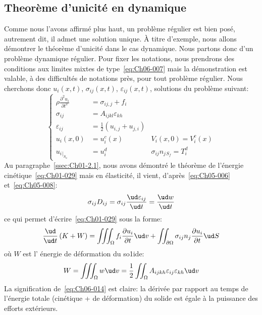 \subsection{Theorème d'unicité en dynamique} \label{ssec:Ch06-1.2}
Comme nous l'avons affirmé plus haut, un problème régulier est bien 
posé, autrement dit, il admet une solution unique.
\`A titre d'exemple, nous allons démontrer le théorème d'unicité dans le cas dynamique.
Nous partons donc d'un problème dynamique régulier.
Pour fixer les notations, nous prendrons des conditions aux limites mixtes de type~\eqref{eq:Ch06-007} mais la démonstration est valable, à des difficultés de notations près, pour tout problème régulier.
Nous cherchons donc $u_i\left( x,t \right)$, $\sigma_{ij}\left( x,t \right)$, $\varepsilon_{ij}\left( x,t \right)$, solutions du problème suivant:
\begin{equation}
    \left\{
    \begin{aligned}
        \rho \frac{\partial^2 u_i}{\partial t^2} &= \sigma_{ij,j} + f_i \\
        \sigma_{ij} &= A_{ijkl} \varepsilon_{kh} \\
        \varepsilon_{ij} &= \frac{1}{2} \left( u_{i,j} + u_{j,i} \right) \\
        u_i \left( x,0 \right) &= u_i^c \left( x \right) \quad & V_i\left( x,0 \right) = V_i^c\left( x \right) \\
        u_i{}_{|_{S_u}} &= u_i^d  \quad & \sigma_{ij} n_j{}_{S_f} = T_i^d
    \end{aligned}
    \right.
    \label{eq:Ch06-012}
\end{equation}
Au paragraphe~\ref{ssec:Ch01-2.1}, nous avons démontré le théorème de l'énergie cinétique~\eqref{eq:Ch01-029} mais en élasticité, il vient, d'après~\eqref{eq:Ch05-006} et~\eqref{eq:Ch05-008}:
\begin{equation}
    \sigma_{ij} D_{ij} = \sigma_{ij} \frac{\ud \varepsilon_{ij}}{\ud t} = \frac{\ud w}{\ud t}
    \label{eq:Ch06-013}
\end{equation}
ce qui permet d'écrire~\eqref{eq:Ch01-029} sous la forme:
\begin{equation}
    \frac{\ud}{\ud t} \left( K + W \right) = \iiint_{\Omega} f_i \frac{\partial u_i}{\partial t} \ud v + \iint_{\partial \Omega} \sigma_{ij} n_j \frac{\partial u_i}{\partial t} \ud S
    \label{eq:Ch06-014}
\end{equation}
où $W$ est l' énergie de déformation du so1ide:
\begin{equation}
    W = \iiint_{\Omega} w \ud v = \frac{1}{2} \iint_{\Omega} A_{ijkh} \varepsilon_{ij} \varepsilon_{kh} \ud v
    \label{eq:Ch06-015}
\end{equation}
La signification de~\eqref{eq:Ch06-014} est claire: la dérivée par rapport au temps de l'énergie totale (cinétique + de déformation) du solide est égale à la puissance des efforts extérieurs.


